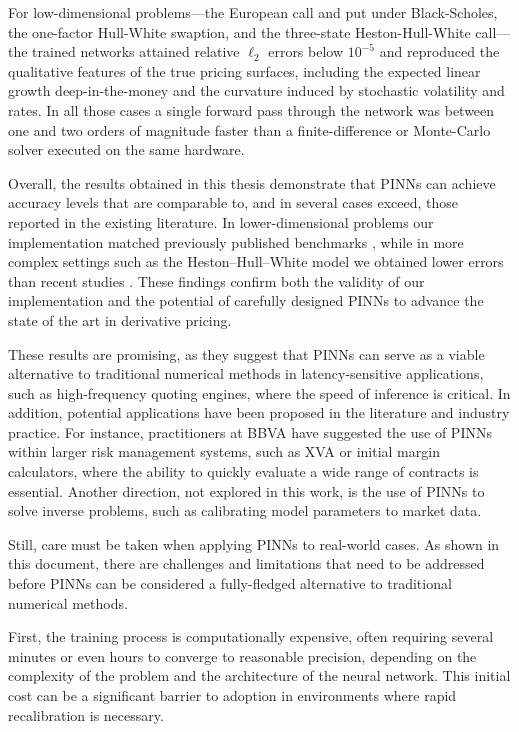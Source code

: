 \documentclass[12pt]{report} %
\theoremstyle{plain} %
\theoremstyle{definition} %
\theoremstyle{remark} %
\begin{document}
For low-dimensional problems—the European call and put under Black-Scholes, the one-factor Hull-White 
swaption, and the three-state Heston-Hull-White call—the trained networks attained relative \(\ell_2\) 
errors below \(10^{-5}\) and reproduced the qualitative features of the true pricing surfaces, 
including the expected linear growth deep-in-the-money and the curvature induced by stochastic 
volatility and rates. In all those cases a single forward pass through the network was between 
one and two orders of magnitude faster than a finite-difference or Monte-Carlo solver executed 
on the same hardware.

Overall, the results obtained in this thesis demonstrate that PINNs can achieve 
accuracy levels that are comparable to, and in several cases exceed, those 
reported in the existing literature. In lower-dimensional problems our 
implementation matched previously published benchmarks \cite{math9010046}, while in more complex 
settings such as the Heston--Hull--White model we obtained lower errors than 
recent studies \cite{repec:kap:annfin:v:20:y:2024:i:3:d:10.1007_s10436-024-00452-7}. These findings confirm both the validity of our implementation 
and the potential of carefully designed PINNs to advance the state of the art 
in derivative pricing. 

These results are promising, as they suggest that PINNs can serve as a
viable alternative to traditional numerical methods in latency-sensitive applications, such as 
high-frequency quoting engines, where the speed of inference is critical. 
In addition, potential applications have been proposed in the literature and industry practice. 
For instance, practitioners at BBVA have suggested the use of PINNs within larger risk 
management systems, such as XVA or initial margin calculators, where the ability to 
quickly evaluate a wide range of contracts is essential. Another direction, not explored 
in this work, is the use of PINNs to solve inverse problems, such as calibrating model 
parameters to market data.

Still, care must be taken when applying PINNs to real-world cases. As shown in this document, there 
are challenges and limitations that need to be addressed before PINNs can be considered a
fully-fledged alternative to traditional numerical methods. 

First, the training process is computationally expensive, often requiring several minutes or even 
hours to converge to reasonable precision, depending on the complexity of the problem and the architecture of the neural network. This initial cost can be a
significant barrier to adoption in environments where rapid recalibration is necessary.
\end{document}
